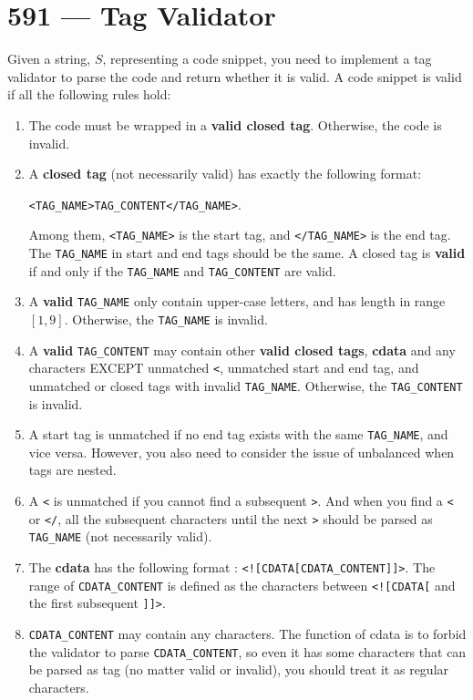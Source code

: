 \section{591 --- Tag Validator}
Given a string, $S$, representing a code snippet, you need to implement a tag validator to parse the code and return whether it is valid. A code snippet is valid if all the following rules hold:

\begin{enumerate}
\item The code must be wrapped in a \textbf{valid closed tag}. Otherwise, the code is invalid.
\item A \textbf{closed tag} (not necessarily valid) has exactly the following format:

 \texttt{<TAG\_NAME>TAG\_CONTENT</TAG\_NAME>}.
 
Among them, \texttt{<TAG\_NAME>} is the start tag, and \texttt{</TAG\_NAME>} is the end tag. The \texttt{TAG\_NAME} in start and end tags should be the same. A closed tag is \textbf{valid} if and only if the \texttt{TAG\_NAME} and \texttt{TAG\_CONTENT} are valid.
\item A \textbf{valid} \texttt{TAG\_NAME} only contain upper-case letters, and has length in range $[1,9]$. Otherwise, the \texttt{TAG\_NAME} is invalid.
\item A \textbf{valid} \texttt{TAG\_CONTENT} may contain other \textbf{valid closed tags}, \textbf{cdata} and any characters EXCEPT unmatched \texttt{<}, unmatched start and end tag, and unmatched or closed tags with invalid \texttt{TAG\_NAME}. Otherwise, the \texttt{TAG\_CONTENT} is invalid.
\item A start tag is unmatched if no end tag exists with the same \texttt{TAG\_NAME}, and vice versa. However, you also need to consider the issue of unbalanced when tags are nested.
\item A \texttt{<} is unmatched if you cannot find a subsequent \texttt{>}. And when you find a \texttt{<} or \texttt{</}, all the subsequent characters until the next \texttt{>} should be parsed as \texttt{TAG\_NAME} (not necessarily valid).
\item The \textbf{cdata} has the following format : \texttt{<![CDATA[CDATA\_CONTENT]]>}. The range of \texttt{CDATA\_CONTENT} is defined as the characters between \texttt{<![CDATA[} and the first subsequent \texttt{]]>}.
\item \texttt{CDATA\_CONTENT} may contain any characters. The function of cdata is to forbid the validator to parse \texttt{CDATA\_CONTENT}, so even it has some characters that can be parsed as tag (no matter valid or invalid), you should treat it as regular characters.
\end{enumerate}

